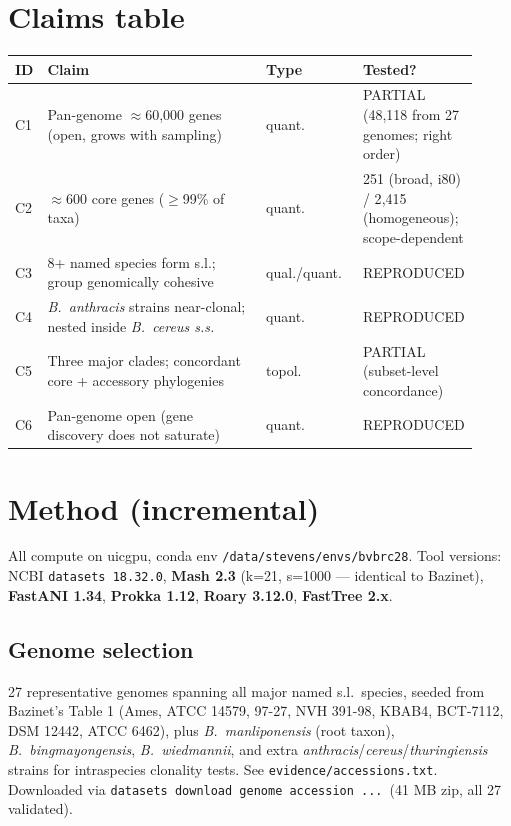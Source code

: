 \documentclass[11pt]{article}
\begin{document}
\section{Claims table}
\begin{longtable}{p{0.05\linewidth}p{0.55\linewidth}p{0.12\linewidth}p{0.20\linewidth}}
\toprule
ID & Claim & Type & Tested? \\ \midrule
C1 & Pan-genome $\approx$60{,}000 genes (open, grows with sampling) & quant.\ & PARTIAL (48{,}118 from 27 genomes; right order) \\
C2 & $\approx$600 core genes ($\ge$99\% of taxa) & quant.\ & 251 (broad, i80) / 2{,}415 (homogeneous); scope-dependent \\
C3 & 8+ named species form s.l.; group genomically cohesive & qual./quant.\ & REPRODUCED \\
C4 & \emph{B.\ anthracis} strains near-clonal; nested inside \emph{B.\ cereus s.s.} & quant.\ & REPRODUCED \\
C5 & Three major clades; concordant core + accessory phylogenies & topol.\ & PARTIAL (subset-level concordance) \\
C6 & Pan-genome open (gene discovery does not saturate) & quant.\ & REPRODUCED \\
\bottomrule
\end{longtable}

\section{Method (incremental)}
All compute on uicgpu, conda env \texttt{/data/stevens/envs/bvbrc28}. Tool versions: NCBI \texttt{datasets 18.32.0}, \textbf{Mash 2.3} (k=21, s=1000 --- identical to Bazinet), \textbf{FastANI 1.34}, \textbf{Prokka 1.12}, \textbf{Roary 3.12.0}, \textbf{FastTree 2.x}.

\subsection{Genome selection}
27 representative genomes spanning all major named s.l.\ species, seeded from Bazinet's Table 1 (Ames, ATCC 14579, 97-27, NVH 391-98, KBAB4, BCT-7112, DSM 12442, ATCC 6462), plus \emph{B.\ manliponensis} (root taxon), \emph{B.\ bingmayongensis}, \emph{B.\ wiedmannii}, and extra \emph{anthracis}/\emph{cereus}/\emph{thuringiensis} strains for intraspecies clonality tests. See \texttt{evidence/accessions.txt}. Downloaded via \texttt{datasets download genome accession ...}\ (41 MB zip, all 27 validated).
\end{document}
